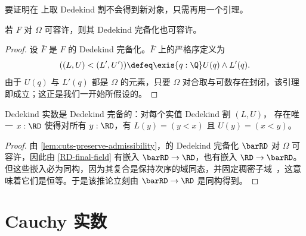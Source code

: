 要证明在 \RD 上取 Dedekind 割不会得到新对象，只需再用一个引理。

\begin{lem} \label{lem:cuts-preserve-admissibility}
  若 $F$ 对 $\Omega$ 可容许，则其 Dedekind 完备化也可容许。
\end{lem}

\begin{proof}
  设 $\bar{F}$ 是 $F$ 的 Dedekind 完备化。$\bar{F}$ 上的严格序定义为
  \begin{equation*}
    ((L,U) < (L',U')) \defeq \exis{q : \Q} U(q) \land L'(q).
  \end{equation*}
  由于 $U(q)$ 与 $L'(q)$ 都是 $\Omega$ 的元素，只要 $\Omega$
  对合取与可数存在封闭，该引理即成立；这正是我们一开始所假设的。
\end{proof}


\begin{cor} \label{RD-dedekind-complete}
  Dedekind 实数是 Dedekind 完备的：对每个实值 Dedekind 割 $(L, U)$，
  存在唯一 $x : \RD$ 使得对所有 $y :
  \RD$，有 $L(y) = (y < x)$ 且 $U(y) = (x < y)$。
\end{cor}

\begin{proof}
  由 \cref{lem:cuts-preserve-admissibility}，\RD 的 Dedekind 完备化 $\barRD$
  对 $\Omega$ 可容许，因此由 \cref{RD-final-field} 有嵌入 $\barRD
  \to \RD$，也有嵌入 $\RD \to \barRD$。但这些嵌入必为同构，因为其复合是保持次序的域同态，并固定稠密子域~\Q，这意味着它们是恒等。于是该推论立刻由 $\barRD \to \RD$ 是同构得到。
\end{proof}

%

\section{Cauchy 实数}
\label{sec:cauchy-reals}

